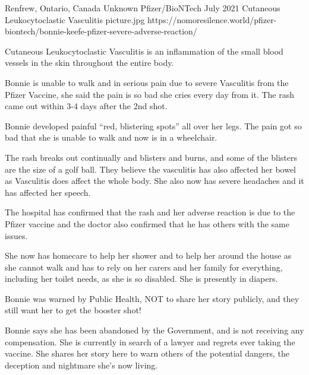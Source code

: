 {Renfrew, Ontario, Canada}
{Unknown}
{Pfizer/BioNTech}
{July 2021}
{Cutaneous Leukocytoclastic Vasculitis}
{picture.jpg}
{https://nomoresilence.world/pfizer-biontech/bonnie-keefe-pfizer-severe-adverse-reaction/}
{

Cutaneous Leukocytoclastic Vasculitis is an inflammation of the small blood
vessels in the skin throughout the entire body.

Bonnie is unable to walk and in serious pain due to severe Vasculitis from the
Pfizer Vaccine, she said the pain is so bad she cries every day from it. The
rash came out within 3-4 days after the 2nd shot.

Bonnie developed painful “red, blistering spots” all over her legs. The pain got
so bad that she is unable to walk and now is in a wheelchair.

The rash breaks out continually and blisters and burns, and some of the blisters
are the size of a golf ball. They believe the vasculitis has also affected her
bowel as Vasculitis does affect the whole body. She also now has severe
headaches and it has affected her speech.

The hospital has confirmed that the rash and her adverse reaction is due to the
Pfizer vaccine and the doctor also confirmed that he has others with the same
issues.

She now has homecare to help her shower and to help her around the house as she
cannot walk and has to rely on her carers and her family for everything,
including her toilet needs, as she is so disabled. She is presently in diapers.

Bonnie was warned by Public Health, NOT to share her story publicly, and they
still want her to get the booster shot!

Bonnie says she has been abandoned by the Government, and is not receiving any
compensation. She is currently in search of a lawyer and regrets ever taking the
vaccine. She shares her story here to warn others of the potential dangers, the
deception and nightmare she’s now living.

}
